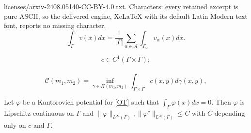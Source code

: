 \documentclass[10pt,a4paper]{amsart}
\newcommand{\G}{\Gamma}
\newcommand{\cA}{{\mathcal A}}
\newcommand{\cC}{{\mathcal C}}
\renewcommand{\phi}{\varphi}
\begin{document}
licenses/arxiv-2408.05140-CC-BY-4.0.txt. Characters: every retained excerpt is pure ASCII, so the delivered engine, XeLaTeX with its default Latin Modern text font, reports no missing character.
\begin{equation}\label{eq:int}
	\int_\Gamma v(x)dx=\frac{1}{|\Gamma|}\sum_{\alpha\in\cA} \int_{\Gamma_\alpha} v_\alpha(x)dx.
\end{equation}

\begin{equation}\label{comm_cost}
c\in C^1(\G\times \G);
\end{equation}\\

\begin{equation}\label{OT}
	 \cC(m_1, m_2)=\inf_{\gamma\in\Pi(m_1, m_2)}\int_{\Gamma\times\Gamma}c(x, y)d\gamma(x, y),
\end{equation}

\begin{prop}\label{normkantorovich}
	Let $\phi$ be a Kantorovich potential for \eqref{OT} such that $\int_{\Gamma}\phi(x)dx=0$. Then $\phi$ is Lipschitz continuous on $\G$ and $\|\phi\|_{L^\infty(\G)}, \|\phi^c\|_{L^\infty(\G)} \le C$ with $C$ depending only on $c$ and $\Gamma$.
\end{prop}
\end{document}
